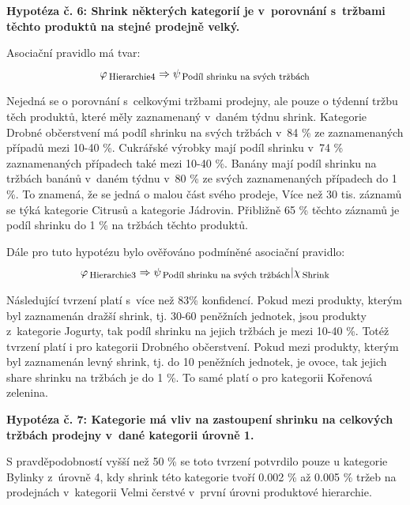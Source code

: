 \vspace*{1em}

\textbf{Hypotéza č. 6: Shrink některých kategorií je v~porovnání s~tržbami těchto produktů na stejné prodejně velký.}

Asociační pravidlo má tvar:
\begin{equation}
    \varphi_{\mbox{\,\footnotesize Hierarchie4}} \Rightarrow \psi_{\mbox{\,\footnotesize Podíl shrinku na svých tržbách}}
\end{equation}

Nejedná se o porovnání s~celkovými tržbami prodejny, ale pouze o týdenní tržbu těch produktů, které měly zaznamenaný v~daném týdnu shrink.
Kategorie Drobné občerstvení má podíl shrinku na svých tržbách v~84 \% ze zaznamenaných případů mezi 10-40 \%.
Cukrářské výrobky  mají podíl shrinku v~74 \% zaznamenaných případech také mezi 10-40 \%.
Banány mají podíl shrinku na tržbách banánů v~daném týdnu v~80 \% ze svých zaznamenaných případech do 1 \%. To znamená, že se jedná o malou část svého prodeje,
Více než 30 tis. záznamů se týká kategorie Citrusů a kategorie Jádrovin. Přibližně 65 \% těchto záznamů je podíl shrinku do 1 \% na tržbách těchto produktů.

Dále pro tuto hypotézu bylo ověřováno podmíněné asociační pravidlo:
\begin{equation}
    \varphi_{\mbox{\,\footnotesize Hierarchie3}} \Rightarrow \psi_{\mbox{\,\footnotesize Podíl shrinku na svých tržbách}} | \chi_{\mbox{\,\footnotesize Shrink}}
\end{equation} 

Následující tvrzení platí s~více než 83\% konfidencí.
Pokud mezi produkty, kterým byl zaznamenán dražší shrink, tj. 30-60 peněžních jednotek, jsou produkty z~kategorie Jogurty, tak podíl shrinku na jejich tržbách je mezi 10-40 \%. Totéž tvrzení platí i pro kategorii Drobného občerstvení.
Pokud mezi produkty, kterým byl zaznamenán levný shrink, tj. do 10 peněžních jednotek, je ovoce, tak jejich share shrinku na tržbách je do 1 \%. To samé platí o pro kategorii Kořenová zelenina.

\vspace*{1em}

\textbf{Hypotéza č. 7: Kategorie má vliv na zastoupení shrinku na celkových tržbách prodejny v~dané kategorii úrovně 1.}

S pravděpodobností vyšší než 50 \% se toto tvrzení potvrdilo pouze u kategorie Bylinky z~úrovně 4, kdy shrink této kategorie tvoří 0.002 \% až 0.005 \% tržeb na prodejnách v~kategorii Velmi čerstvé v~první úrovni produktové hierarchie.

